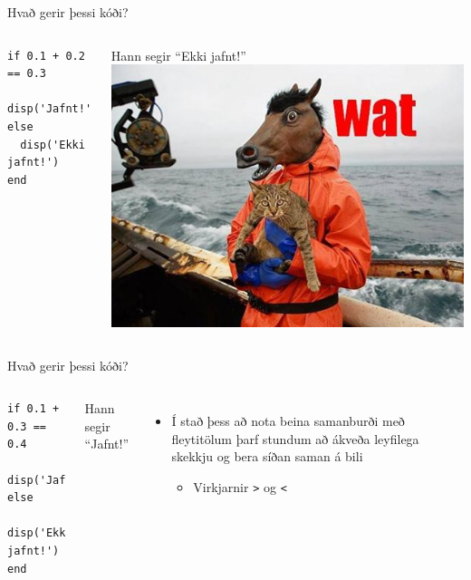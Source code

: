 \documentclass{beamer}
\begin{document}
\begin{frame}[fragile]{Hvað gerir þessi kóði?}
\begin{columns}
\begin{verbatim}
if 0.1 + 0.2 == 0.3
  disp('Jafnt!')
else
  disp('Ekki jafnt!')
end
\end{verbatim}
\pause
Hann segir ``Ekki jafnt!''
\pause
\includegraphics[width=\linewidth]{../Pics/wat}
\end{columns}
\end{frame}

\begin{frame}[fragile]{Hvað gerir þessi kóði?}
\begin{columns}
\begin{verbatim}
if 0.1 + 0.3 == 0.4
  disp('Jafnt!')
else
  disp('Ekki jafnt!')
end
\end{verbatim}
\pause
Hann segir ``Jafnt!''
\begin{itemize}
 \item Í stað þess að nota beina samanburði með fleytitölum þarf stundum að ákveða leyfilega skekkju og bera síðan saman á bili
 \begin{itemize}
  \item Virkjarnir \texttt{>} og \texttt{<}
 \end{itemize}
\end{itemize}
\end{columns}
\end{frame}
\end{document}
